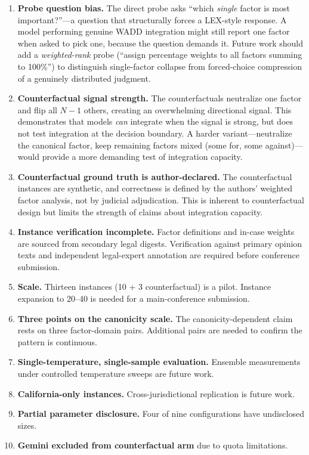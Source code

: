 \documentclass[11pt,twocolumn]{article}
\begin{document}
\begin{enumerate}
\item \textbf{Probe question bias.} The direct probe asks ``which \emph{single} factor is most important?''---a question that structurally forces a LEX-style response. A model performing genuine WADD integration might still report one factor when asked to pick one, because the question demands it. Future work should add a \emph{weighted-rank} probe (``assign percentage weights to all factors summing to 100\%'') to distinguish single-factor collapse from forced-choice compression of a genuinely distributed judgment.
\item \textbf{Counterfactual signal strength.} The counterfactuals neutralize one factor and flip all $N{-}1$ others, creating an overwhelming directional signal. This demonstrates that models \emph{can} integrate when the signal is strong, but does not test integration at the decision boundary. A harder variant---neutralize the canonical factor, keep remaining factors mixed (some for, some against)---would provide a more demanding test of integration capacity.
\item \textbf{Counterfactual ground truth is author-declared.} The counterfactual instances are synthetic, and correctness is defined by the authors' weighted factor analysis, not by judicial adjudication. This is inherent to counterfactual design but limits the strength of claims about integration capacity.
\item \textbf{Instance verification incomplete.} Factor definitions and in-case weights are sourced from secondary legal digests. Verification against primary opinion texts and independent legal-expert annotation are required before conference submission.
\item \textbf{Scale.} Thirteen instances (10 + 3 counterfactual) is a pilot. Instance expansion to 20--40 is needed for a main-conference submission.
\item \textbf{Three points on the canonicity scale.} The canonicity-dependent claim rests on three factor-domain pairs. Additional pairs are needed to confirm the pattern is continuous.
\item \textbf{Single-temperature, single-sample evaluation.} Ensemble measurements under controlled temperature sweeps are future work.
\item \textbf{California-only instances.} Cross-jurisdictional replication is future work.
\item \textbf{Partial parameter disclosure.} Four of nine configurations have undisclosed sizes.
\item \textbf{Gemini excluded from counterfactual arm} due to quota limitations.
\end{enumerate}
\end{document}

